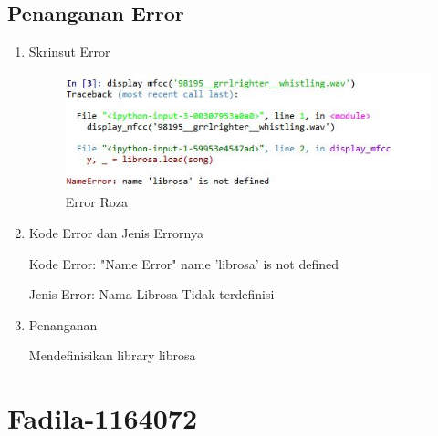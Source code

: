 \begin{enumerate}
\subsection{Penanganan Error}
\begin{enumerate}

\item Skrinsut Error
\begin{figure}[ht]
\centering
\includegraphics[scale=0.7]{figures/erorroza.jpeg}
\caption{ Error Roza}
\label{6}
\end{figure}
\item Kode Error dan Jenis Errornya
\par Kode Error: "Name Error" name 'librosa' is not defined
\par Jenis Error: Nama Librosa Tidak terdefinisi
\item Penanganan
\par Mendefinisikan library librosa

\end{enumerate}
\end{enumerate}








\par
\par
\section{Fadila-1164072}
